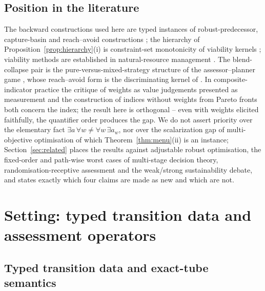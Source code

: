 \documentclass[preprint,11pt,authoryear]{elsarticle}
\theoremstyle{definition}
\theoremstyle{remark}
\begin{document}
\subsection{Position in the literature}

The backward constructions used here are typed instances of robust-predecessor, capture-basin and reach--avoid constructions \citep{Aubin1991,Aubin2011,SaintPierre1994,Lygeros1999,AubinCatte2002}; the hierarchy of Proposition~\ref{prop:hierarchy}(i) is constraint-set monotonicity of viability kernels \citep{Aubin1991,Frankowska1989}; viability methods are established in natural-resource management \citep{DeLaraDoyen2008,Doyen2012}. The blend-collapse pair is the pure-versus-mixed-strategy structure of the assessor--planner game \citep{vonNeumann1928,Sion1958}, whose reach--avoid form is the discriminating kernel of \citet{Cardaliaguet1996}. In composite-indicator practice the critique of weights as value judgements presented as measurement \citep{Hickel2020,Fischer2022} and the construction of indices without weights from Pareto fronts \citep{Gao2023} both concern the index; the result here is orthogonal -- even with weights elicited faithfully, the quantifier order produces the gap. We do not assert priority over the elementary fact $\exists a\,\forall w\ne\forall w\,\exists a_w$, nor over the scalarization gap of multi-objective optimisation of which Theorem~\ref{thm:menu}(ii) is an instance; Section~\ref{sec:related} places the results against adjustable robust optimisation, the fixed-order and path-wise worst cases of multi-stage decision theory, randomisation-receptive assessment and the weak/strong sustainability debate, and states exactly which four claims are made as new and which are not.

\section{Setting: typed transition data and assessment operators}\label{sec:setting}

\subsection{Typed transition data and exact-tube semantics}
\end{document}
